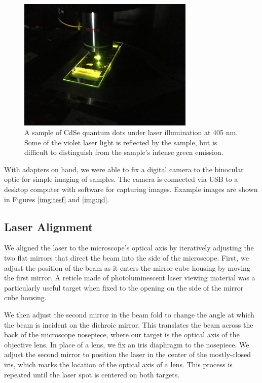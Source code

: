 \begin{figure}[H]
    \centering
    \includegraphics[width=0.75\textwidth]{img/objective-sample.JPG}
    \caption[Sample on stage under laser illumination.]{A sample of CdSe quantum dots under laser illumination at 405 nm. Some of the violet laser light is reflected by the sample, but is difficult to distinguish from the sample's intense green emission.}
    \label{img:objective-sample}
\end{figure}

With adapters on hand, we were able to fix a digital camera to the binocular optic for simple imaging of samples. The camera is connected via USB to a desktop computer with software for capturing images. Example images are shown in Figures \ref{img:tesf} and \ref{img:qd}.


\subsection{Laser Alignment}
We aligned the laser to the microscope's optical axis by iteratively adjusting the two flat mirrors that direct the beam into the side of the microscope. First, we adjust the position of the beam as it enters the mirror cube housing by moving the first mirror. A reticle made of photoluminescent laser viewing material was a particularly useful target when fixed to the opening on the side of the mirror cube housing. 

We then adjust the second mirror in the beam fold to change the angle at which the beam is incident on the dichroic mirror. This translates the beam across the back of the microscope nosepiece, where our target is the optical axis of the objective lens. In place of a lens, we fix an iris diaphragm to the nosepiece. We adjust the second mirror to position the laser in the center of the mostly-closed iris, which marks the location of the optical axis of a lens. This process is repeated until the laser spot is centered on both targets.

